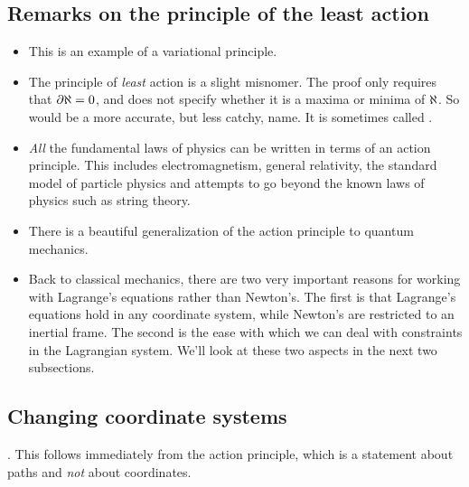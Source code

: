 \subsection{Remarks on the principle of the least action}
%
\begin{itemize}
%
\item This is an example of a variational principle.
%
\item The principle of \emph{least} action is a slight misnomer. The proof only requires that $\partial\aleph = 0$, and does not specify whether it is a maxima or minima of $\aleph$. So  would be a more accurate, but less catchy, name. It is sometimes called .
%
\item \emph{All} the fundamental laws of physics can be written in terms of an action principle. This includes electromagnetism, general relativity, the standard model of particle physics and attempts to go beyond the known laws of physics such as string theory. 
%
\item There is a beautiful generalization of the action principle to quantum mechanics.
%
\item Back to classical mechanics, there are two very important reasons for working with Lagrange's equations rather than Newton's. The first is that Lagrange's equations hold in any coordinate system, while Newton's are restricted to an inertial frame. The second is the ease with which we can deal with constraints in the Lagrangian system. We'll look at these two aspects in the next two subsections.
%
\end{itemize}


\subsection{Changing coordinate systems}
%
. This follows immediately from the action principle, which is a statement about paths and \emph{not} about coordinates.
%
%





